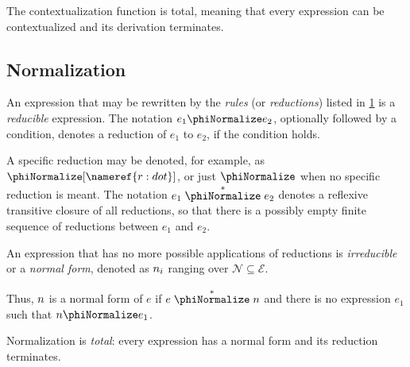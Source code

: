\begin{theorem}\label{thm:contextualization-total}
The contextualization function is total, meaning that
  every expression can be contextualized and its derivation terminates.
\end{theorem}

\subsection{Normalization}\label{sec:normalization}

An expression that may be rewritten by the \emph{rules} (or \emph{reductions})
  listed in \cref{fig:reduction} is a \emph{reducible} expression.
The notation \(\phinoNormalize{e_1}{e_2}\), optionally followed by a condition,
  denotes a reduction of \(e_1\) to \(e_2\), if the condition holds.

A specific reduction may be denoted, for example,
  as \(\phiNormalize[\nameref{r:dot}]\),
  or just \(\phiNormalize\) when no specific reduction is meant.
The notation \(e_1 \phiTransNormalize e_2\) denotes a reflexive transitive
  closure of all reductions, so that there is a possibly empty finite
  sequence of reductions between \(e_1\) and \(e_2\).

\begin{definition}
An expression that has no more possible applications of reductions
  is \emph{irreducible} or a \emph{normal form}, denoted as \(n{}_i\)
  ranging over \(\mathcal{N} \subseteq \mathcal{E}\).
\end{definition}

Thus, \(n\) is a normal form of \(e\) if \(e \phiTransNormalize \nf\) and
  there is no expression \(e_1\) such that \(\phinoNormalize{\nf}{e_1}\).

\begin{figure}
\begin{mdframed}
\renewcommand{\arraystretch}{1.2}
\end{mdframed}
\label{fig:reduction}
\end{figure}

\begin{theorem}\label{thm:normalization-total}
Normalization is \emph{total}:
  every expression has a normal form and its reduction terminates.
\end{theorem}

